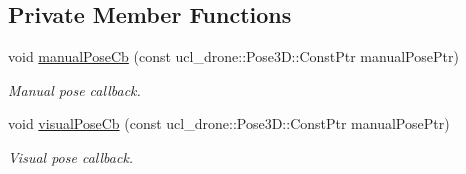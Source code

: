 \subsection*{Private Member Functions}
\begin{DoxyCompactItemize}
\item 
void \hyperlink{classManualPoseEstimator_a1aa19bbcb80a687fa0b9416ee272cdbd}{manual\+Pose\+Cb} (const ucl\+\_\+drone\+::\+Pose3\+D\+::\+Const\+Ptr manual\+Pose\+Ptr)
\begin{DoxyCompactList}\small\item\em Manual pose callback. \end{DoxyCompactList}\item 
void \hyperlink{classManualPoseEstimator_a77e0e96d37601fefa3dd0ac306081723}{visual\+Pose\+Cb} (const ucl\+\_\+drone\+::\+Pose3\+D\+::\+Const\+Ptr manual\+Pose\+Ptr)
\begin{DoxyCompactList}\small\item\em Visual pose callback. \end{DoxyCompactList}\end{DoxyCompactItemize}
